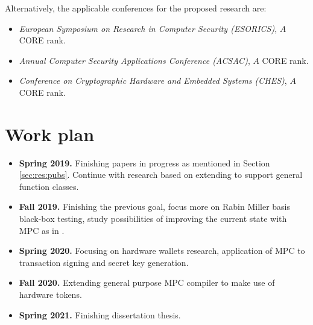 \documentclass[
  digital, %
  twoside, %
  table,   %
  lof,     %
  lot,     %
]{fithesis3}
\newcommand{\itembf}[1]{\item {\bf{#1}}}
\theoremstyle{definition}
\theoremstyle{remark}
\begin{document}
Alternatively, the applicable conferences for the proposed research are:

\begin{itemize}
	\item \emph{European Symposium on Research in Computer Security (ESORICS)}, $A$ CORE rank.
	
	\item \emph{Annual Computer Security Applications Conference (ACSAC)}, $A$ CORE rank.
	
	\item \emph{Conference on Cryptographic Hardware and Embedded Systems (CHES)}, $A$ CORE rank.
	
	
	
	
\end{itemize}


\section{Work plan}
\begin{itemize}
	\itembf{Spring 2019.} Finishing papers in progress as mentioned in Section \ref{sec:res:pubs}. Continue with research based on extending \cite{2017-ccs-mavroudis} to support general function classes.
	
	\itembf{Fall 2019.} Finishing the previous goal, focus more on Rabin Miller basis black-box testing, study possibilities of improving the current state with MPC as in \cite{DCMBR18}.
	
	\itembf{Spring 2020.} Focusing on hardware wallets research, application of MPC to transaction signing and secret key generation.
	
	\itembf{Fall 2020.} Extending general purpose MPC compiler to make use of hardware tokens.
	
	\itembf{Spring 2021.} Finishing dissertation thesis.
\end{itemize}
\end{document}

